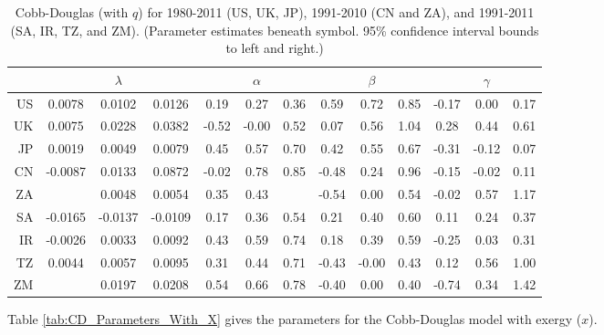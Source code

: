 \documentclass[preprint,authoryear,12pt]{elsarticle}\usepackage{graphicx, color}
\begin{document}
\begin{table}[H]
\begin{center}
\caption{Cobb-Douglas (with $q$) for 1980-2011 (US, UK, JP), 1991-2010 (CN and ZA), and 1991-2011 (SA, IR, TZ, and ZM). (Parameter estimates beneath symbol. 95\% confidence interval bounds to left and right.)}
\label{tab:CD_Parameters_With_Q}
{\tiny
\begin{tabular}{r|ccc|ccc|ccc|ccc}
  \hline
 &   & $\lambda$ &   &   & $\alpha$ &   &   & $\beta$ &   &   & $\gamma$ &   \\ 
  \hline
US & 0.0078 & 0.0102 & 0.0126 & 0.19 & 0.27 & 0.36 & 0.59 & 0.72 & 0.85 & -0.17 & 0.00 & 0.17 \\ 
  UK & 0.0075 & 0.0228 & 0.0382 & -0.52 & -0.00 & 0.52 & 0.07 & 0.56 & 1.04 & 0.28 & 0.44 & 0.61 \\ 
  JP & 0.0019 & 0.0049 & 0.0079 & 0.45 & 0.57 & 0.70 & 0.42 & 0.55 & 0.67 & -0.31 & -0.12 & 0.07 \\ 
  CN & -0.0087 & 0.0133 & 0.0872 & -0.02 & 0.78 & 0.85 & -0.48 & 0.24 & 0.96 & -0.15 & -0.02 & 0.11 \\ 
  ZA &  & 0.0048 & 0.0054 & 0.35 & 0.43 &  & -0.54 & 0.00 & 0.54 & -0.02 & 0.57 & 1.17 \\ 
  SA & -0.0165 & -0.0137 & -0.0109 & 0.17 & 0.36 & 0.54 & 0.21 & 0.40 & 0.60 & 0.11 & 0.24 & 0.37 \\ 
  IR & -0.0026 & 0.0033 & 0.0092 & 0.43 & 0.59 & 0.74 & 0.18 & 0.39 & 0.59 & -0.25 & 0.03 & 0.31 \\ 
  TZ & 0.0044 & 0.0057 & 0.0095 & 0.31 & 0.44 & 0.71 & -0.43 & -0.00 & 0.43 & 0.12 & 0.56 & 1.00 \\ 
  ZM &  & 0.0197 & 0.0208 & 0.54 & 0.66 & 0.78 & -0.40 & 0.00 & 0.40 & -0.74 & 0.34 & 1.42 \\ 
   \hline
\end{tabular}
}
\end{center}
\end{table}



Table \ref{tab:CD_Parameters_With_X} gives the parameters for the Cobb-Douglas model with exergy ($x$).
\end{document}
